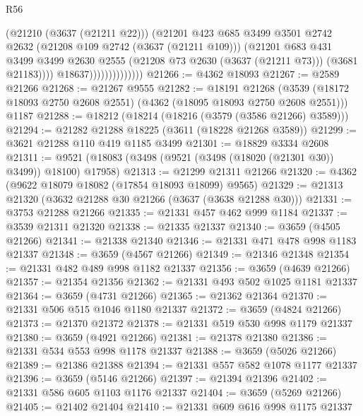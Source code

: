 \begin{lexlean}{R56}
\begin{coremodule}
                                  (@21210 (@3637 (@21211 @22)))
                                  (@21201
                                    @423
                                    @685
                                    @3499
                                    @3501
                                    @2742
                                    @2632
                                    (@21208 @109 @2742 (@3637 (@21211 @109)))
                                    (@21201
                                      @683
                                      @431
                                      @3499
                                      @3499
                                      @2630
                                      @2555
                                      (@21208 @73 @2630 (@3637 (@21211 @73)))
                                      (@3681 @21183))))
                                @18637))))))))))))))
@21266 := @4362 @18093
@21267 := @2589 @21266
@21268 := @21267 @9555
@21282 := @18191
    @21268
    (@3539 (@18172 @18093 @2750 @2608 @2551) (@4362 (@18095 @18093 @2750 @2608 @2551)))
    @1187
@21288 := @18212 (@18214 (@18216 (@3579 (@3586 @21266) @3589)))
@21294 := @21282 @21288 @18225 (@3611 (@18228 @21268 @3589))
@21299 := @3621 @21288 @110 @419 @1185 @3499
@21301 := @18829 @3334 @2608
@21311 := @9521 (@18083 (@3498 (@9521 (@3498 (@18020 (@21301 @30)) @3499)) @18100) @17958)
@21313 := @21299 @21311 @21266
@21320 := @4362 (@9622 @18079 @18082 (@17854 @18093 @18099) @9565)
@21329 := @21313 @21320 (@3632 @21288 @30 @21266 (@3637 (@3638 @21288 @30)))
@21331 := @3753 @21288 @21266
@21335 := @21331 @457 @462 @999 @1184
@21337 := @3539 @21311 @21320
@21338 := @21335 @21337
@21340 := @3659 (@4505 @21266)
@21341 := @21338 @21340
@21346 := @21331 @471 @478 @998 @1183 @21337
@21348 := @3659 (@4567 @21266)
@21349 := @21346 @21348
@21354 := @21331 @482 @489 @998 @1182 @21337
@21356 := @3659 (@4639 @21266)
@21357 := @21354 @21356
@21362 := @21331 @493 @502 @1025 @1181 @21337
@21364 := @3659 (@4731 @21266)
@21365 := @21362 @21364
@21370 := @21331 @506 @515 @1046 @1180 @21337
@21372 := @3659 (@4824 @21266)
@21373 := @21370 @21372
@21378 := @21331 @519 @530 @998 @1179 @21337
@21380 := @3659 (@4921 @21266)
@21381 := @21378 @21380
@21386 := @21331 @534 @553 @998 @1178 @21337
@21388 := @3659 (@5026 @21266)
@21389 := @21386 @21388
@21394 := @21331 @557 @582 @1078 @1177 @21337
@21396 := @3659 (@5146 @21266)
@21397 := @21394 @21396
@21402 := @21331 @586 @605 @1103 @1176 @21337
@21404 := @3659 (@5269 @21266)
@21405 := @21402 @21404
@21410 := @21331 @609 @616 @998 @1175 @21337

\end{coremodule}
\end{lexlean}
